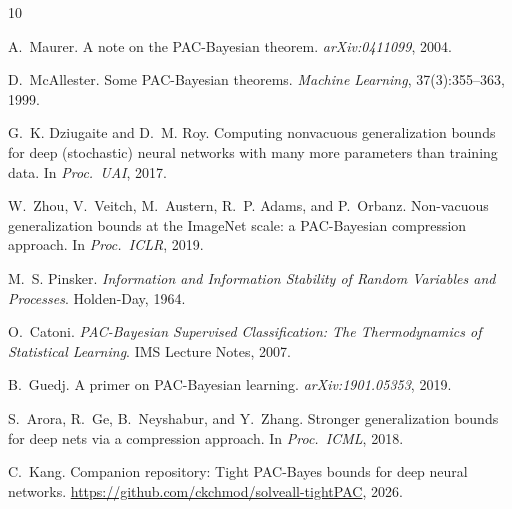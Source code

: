 \documentclass[11pt,a4paper]{article}
\begin{document}
\begin{thebibliography}{10}

A.~Maurer.
\newblock A note on the PAC-Bayesian theorem.
\newblock \emph{arXiv:0411099}, 2004.

D.~McAllester.
\newblock Some PAC-Bayesian theorems.
\newblock \emph{Machine Learning}, 37(3):355--363, 1999.

G.~K. Dziugaite and D.~M. Roy.
\newblock Computing nonvacuous generalization bounds for deep (stochastic) neural networks with many more parameters than training data.
\newblock In \emph{Proc.\ UAI}, 2017.

W.~Zhou, V.~Veitch, M.~Austern, R.~P. Adams, and P.~Orbanz.
\newblock Non-vacuous generalization bounds at the ImageNet scale: a PAC-Bayesian compression approach.
\newblock In \emph{Proc.\ ICLR}, 2019.

M.~S. Pinsker.
\newblock \emph{Information and Information Stability of Random Variables and Processes}.
\newblock Holden-Day, 1964.

O.~Catoni.
\newblock \emph{PAC-Bayesian Supervised Classification: The Thermodynamics of Statistical Learning}.
\newblock IMS Lecture Notes, 2007.

B.~Guedj.
\newblock A primer on PAC-Bayesian learning.
\newblock \emph{arXiv:1901.05353}, 2019.

S.~Arora, R.~Ge, B.~Neyshabur, and Y.~Zhang.
\newblock Stronger generalization bounds for deep nets via a compression approach.
\newblock In \emph{Proc.\ ICML}, 2018.

C.~Kang.
\newblock Companion repository: Tight PAC-Bayes bounds for deep neural networks.
\newblock \url{https://github.com/ckchmod/solveall-tightPAC}, 2026.

\end{thebibliography}
\end{document}
